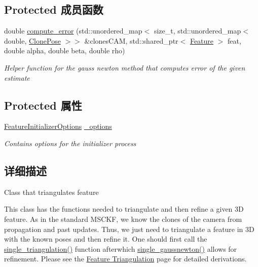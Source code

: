 \subsection*{Protected 成员函数}
\begin{DoxyCompactItemize}
\item 
double \hyperlink{classov__core_1_1FeatureInitializer_a2b851be642683766f649a751452407bf}{compute\+\_\+error} (std\+::unordered\+\_\+map$<$ size\+\_\+t, std\+::unordered\+\_\+map$<$ double, \hyperlink{structov__core_1_1FeatureInitializer_1_1ClonePose}{Clone\+Pose} $>$$>$ \&clones\+C\+AM, std\+::shared\+\_\+ptr$<$ \hyperlink{classov__core_1_1Feature}{Feature} $>$ feat, double alpha, double beta, double rho)
\begin{DoxyCompactList}\small\item\em Helper function for the gauss newton method that computes error of the given estimate \end{DoxyCompactList}\end{DoxyCompactItemize}
\subsection*{Protected 属性}
\begin{DoxyCompactItemize}
\item 
\mbox{\label{classov__core_1_1FeatureInitializer_a1e9a923db5dc5ced439d0516ff884964}} 
\hyperlink{structov__core_1_1FeatureInitializerOptions}{Feature\+Initializer\+Options} \hyperlink{classov__core_1_1FeatureInitializer_a1e9a923db5dc5ced439d0516ff884964}{\+\_\+options}
\begin{DoxyCompactList}\small\item\em Contains options for the initializer process \end{DoxyCompactList}\end{DoxyCompactItemize}


\subsection{详细描述}
Class that triangulates feature 

This class has the functions needed to triangulate and then refine a given 3D feature. As in the standard M\+S\+C\+KF, we know the clones of the camera from propagation and past updates. Thus, we just need to triangulate a feature in 3D with the known poses and then refine it. One should first call the \hyperlink{classov__core_1_1FeatureInitializer_a86e8f87f677689e6588516f8d08086d7}{single\+\_\+triangulation()} function afterwhich \hyperlink{classov__core_1_1FeatureInitializer_a27eb3af3c4e22473e795966eff800599}{single\+\_\+gaussnewton()} allows for refinement. Please see the \hyperlink{update-featinit}{Feature Triangulation} page for detailed derivations. 

